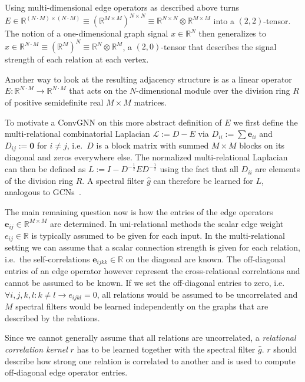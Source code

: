 \documentclass[12pt]{scrartcl}
\begin{document}
Using multi-dimensional edge operators as described above turns $E \in \mathbb{R}^{(N \cdot M) \times (N \cdot M)} \equiv {(\mathbb{R}^{M \times M})}^{N \times N} \equiv \mathbb{R}^{N \times N} \otimes \mathbb{R}^{M \times M}$ into a $(2,2)$-tensor.
The notion of a one-dimensional graph signal $x \in \mathbb{R}^{N}$ then generalizes to $x \in \mathbb{R}^{N \cdot M} \equiv {(\mathbb{R}^M)}^N \equiv \mathbb{R}^N \otimes \mathbb{R}^M$, a $(2, 0)$-tensor that describes the signal strength of each relation at each vertex.

Another way to look at the resulting adjacency structure is as a linear operator $E: \mathbb{R}^{N \cdot M} \to \mathbb{R}^{N \cdot M}$ that acts on the $N$-dimensional module over the division ring $R$ of positive semidefinite real $M \times M$ matrices.

To motivate a ConvGNN on this more abstract definition of $E$ we first define the multi-relational combinatorial Laplacian $\mathcal{L} := D - E$ via $D_{ii} := \sum \bm{e}_{ii}$ and $D_{ij} := \bm{0}$ for $i \neq j$, i.e.\ $D$ is a block matrix with summed $M \times M$ blocks on its diagonal and zeros everywhere else.
The normalized multi-relational Laplacian can then be defined as $L := I - D^{-\frac{1}{2}} E D^{-\frac{1}{2}}$ using the fact that all $D_{ii}$ are elements of the division ring $R$.
A spectral filter $\hat{g}$ can therefore be learned for $L$, analogous to GCNs~\cite{Kipf2017}.

The main remaining question now is how the entries of the edge operators $\bm{e}_{ij} \in \mathbb{R}^{M \times M}$ are determined.
In uni-relational methods the scalar edge weight $e_{ij} \in \mathbb{R}$ is typically assumed to be given for each input.
In the multi-relational setting we can assume that a scalar connection strength is given for each relation, i.e.\ the self-correlations $\bm{e}_{ijkk} \in \mathbb{R}$ on the diagonal are known.
The off-diagonal entries of an edge operator however represent the cross-relational correlations and cannot be assumed to be known.
If we set the off-diagonal entries to zero, i.e.\ $\forall i, j, k, l: k \neq l \rightarrow e_{ijkl} = 0$, all relations would be assumed to be uncorrelated and $M$ spectral filters would be learned independently on the graphs that are described by the relations.

Since we cannot generally assume that all relations are uncorrelated, a \textit{relational correlation kernel} $r$ has to be learned together with the spectral filter $\hat{g}$.
$r$ should describe how strong one relation is correlated to another and is used to compute off-diagonal edge operator entries.
\end{document}
